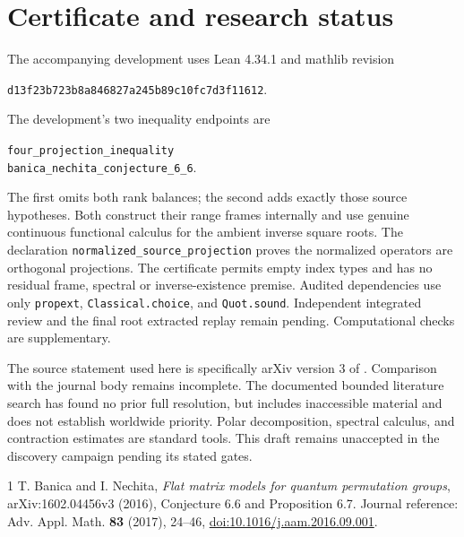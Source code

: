 \documentclass[11pt]{article}
\begin{document}
\section{Certificate and research status}
The accompanying development uses Lean 4.34.1 and mathlib revision
\begin{center}
\texttt{d13f23b723b8a846827a245b89c10fc7d3f11612}.
\end{center}
The development's two inequality endpoints are
\begin{center}
\texttt{four\_projection\_inequality}\\
\texttt{banica\_nechita\_conjecture\_6\_6}.
\end{center}
The first omits both rank balances; the second adds exactly those source
hypotheses. Both construct their range frames internally and use genuine
continuous functional calculus for the ambient inverse square roots.
The declaration \texttt{normalized\_source\_projection} proves the normalized
operators are orthogonal projections. The certificate permits empty index
types and has no residual frame, spectral or inverse-existence premise.
Audited dependencies use only \texttt{propext}, \texttt{Classical.choice},
and \texttt{Quot.sound}. Independent integrated review and the final root
extracted replay remain pending. Computational checks are supplementary.

The source statement used here is specifically arXiv version 3 of \cite{BN}.
Comparison with the journal body remains incomplete. The documented bounded
literature search has found no prior full resolution, but includes inaccessible
material and does not establish worldwide priority. Polar decomposition,
spectral calculus, and contraction estimates are standard tools. This draft
remains unaccepted in the discovery campaign pending its stated gates.

\begin{thebibliography}{1}
 T. Banica and I. Nechita,
\emph{Flat matrix models for quantum permutation groups},
arXiv:1602.04456v3 (2016), Conjecture 6.6 and Proposition 6.7.
Journal reference: Adv. Appl. Math. \textbf{83} (2017), 24--46,
\href{https://doi.org/10.1016/j.aam.2016.09.001}{doi:10.1016/j.aam.2016.09.001}.
\end{thebibliography}
\end{document}
